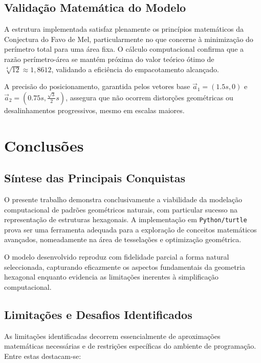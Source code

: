 \documentclass[12pt,a4paper,oneside]{extarticle}
\begin{document}
\subsection{Validação Matemática do Modelo}

A estrutura implementada satisfaz plenamente os princípios matemáticos da Conjectura do Favo de Mel, particularmente no que concerne à minimização do perímetro total para uma área fixa. O cálculo computacional confirma que a razão perímetro-área se mantém próxima do valor teórico ótimo de $\sqrt[4]{12} \approx 1,8612$, validando a eficiência do empacotamento alcançado.

A precisão do posicionamento, garantida pelos vetores base $\vec{a}_1 = (1.5s, 0)$ e $\vec{a}_2 = (0.75s, \frac{\sqrt{3}}{2}s)$, assegura que não ocorrem distorções geométricas ou desalinhamentos progressivos, mesmo em escalas maiores.

\clearpage

\section{Conclusões}

\subsection{Síntese das Principais Conquistas}

O presente trabalho demonstra conclusivamente a viabilidade da modelação computacional de padrões geométricos naturais, com particular sucesso na representação de estruturas hexagonais. A implementação em \texttt{Python/turtle} prova ser uma ferramenta adequada para a exploração de conceitos matemáticos avançados, nomeadamente na área de tesselações e optimização geométrica.

O modelo desenvolvido reproduz com fidelidade parcial a forma natural seleccionada, capturando eficazmente os aspectos fundamentais da geometria hexagonal enquanto evidencia as limitações inerentes à simplificação computacional.

\subsection{Limitações e Desafios Identificados}

As limitações identificadas decorrem essencialmente de aproximações matemáticas necessárias e de restrições específicas do ambiente de programação. Entre estas destacam-se:
\end{document}
